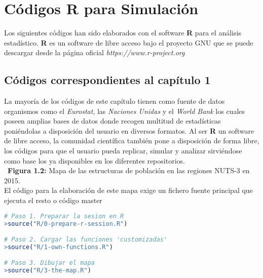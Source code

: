 
\chapter{C\'odigos R para Simulaci\'on} %

\label{AppendixE} %

\vspace{-1cm}
Los siguientes c\'odigos han sido elaborados con el software \textbf{R} para el an\'alisis estad\'istico. \textbf{R} es un software de libre acceso bajo el proyecto GNU que se puede descargar desde la p\'agina oficial \textit{\emph{https://www.r-project.org}}



\section{C\'odigos correspondientes al cap\'itulo 1}

La mayor\'ia de los c\'odigos de este cap\'itulo tienen como fuente de datos organismos como el \textit{Eurostat}, las \textit{Naciones Unidas} y el \textit{World Bank} los cuales poseen amplias bases de datos donde recogen multitud de estad\'isticas poni\'endolas a disposici\'on del usuario en diversos formatos. Al ser \textbf{R} un software de libre acceso, la comunidad cient\'ifica tambi\'en pone a disposici\'on de forma libre, los c\'odigos para que el usuario pueda replicar, simular y analizar sirvi\'endose como base los ya disponibles en los diferentes repositorios.\\ 

\noindent \textbullet\hspace{0.3cm} \textbf{Figura 1.2:} Mapa de las estructuras de poblaci\'on en las regiones NUTS-3 en 2015.\\

\noindent El c\'odigo para la elaboraci\'on de este mapa exige un fichero fuente principal que ejecuta el resto o c\'odigo master

\begin{lstlisting}[language=R, caption=C\'odigo master.]
# Paso 1. Preparar la sesion en R
>source("R/0-prepare-r-session.R")

# Paso 2. Cargar las funciones 'customizadas'
>source("R/1-own-functions.R")

# Paso 3. Dibujar el mapa
>source("R/3-the-map.R")

\end{lstlisting}

